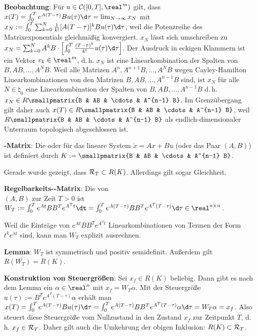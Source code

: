 \linie

\textbf{Beobachtung}:
Für $u \in \C([0, T], \real^m)$ gilt, dass
$x(T) = \int_0^T e^{A(T-\tau)} B u(\tau) \d\tau = \lim_{N \to \infty} x_N$
mit $x_N := \int_0^T \sum_{k=0}^N \frac{1}{k!} [A(T - \tau)]^k Bu(\tau)\d\tau$,
weil die Potenzreihe des Matrixexponentials gleichmäßig konvergiert.
$x_N$ lässt sich umschreiben zu
$x_N = \sum_{k=0}^N A^k B \cdot \left[\int_0^T \frac{(T - \tau)^k}{k!} u(\tau)\d\tau\right]$.
Der Ausdruck in eckigen Klammern ist ein Vektor $v_k \in \real^m$,
d.\,h. $x_N$ ist eine Linearkombination der Spalten von $B, AB, \dotsc, A^N B$.
Weil alle Matrizen $A^n, A^{n+1} B, \dotsc, A^N B$ wegen Cayley-Hamilton
Linearkombinationen von den Matrizen $B, AB, \dotsc, A^{n-1} B$ sind,
ist $x_N$ für alle $N \in \natural_0$ eine Linearkombination der Spalten
von $B, AB, \dotsc, A^{n-1} B$
d.\,h. $x_N \in R\smallpmatrix{B & AB & \cdots & A^{n-1} B}$.
Im Grenzübergang gilt daher auch $x(T) \in R\smallpmatrix{B & AB & \cdots & A^{n-1} B}$,
weil $R\smallpmatrix{B & AB & \cdots & A^{n-1} B}$ als endlich-dimensionaler Unterraum
topologisch abgeschlossen ist.

\textbf{-Matrix}:
Die  oder 
für das lineare System
$\dot{x} = Ax + Bu$ (oder das Paar $(A, B)$) ist definiert durch
$K := \smallpmatrix{B & AB & \cdots & A^{n-1} B}$.

Gerade wurde gezeigt, dass $\mathcal{R}_T \subset R(K)$.
Allerdings gilt sogar Gleichheit.

\linie
\pagebreak

\textbf{Regelbarkeits--Matrix}:
Die  von\\
$(A, B)$ zur Zeit $T > 0$ ist
$W_T := \int_0^T e^{At} BB^T e^{A^Tt}\dt =
\int_0^T e^{A(T-\tau)} BB^T e^{A^T(T-\tau)}\d\tau \in \real^{n \times n}$.

Weil die Einträge von $e^{At} BB^T e^{A^Tt}$ Linearkombinationen von Termen der Form
$t^k e^{\lambda t}$ sind, kann man $W_T$ explizit ausrechnen.

\textbf{Lemma}:
$W_T$ ist symmetrisch und positiv semidefinit.
Außerdem gilt $R(W_T) = R(K)$.

\textbf{Konstruktion von Steuergrößen}:
Sei $x_f \in R(K)$ beliebig.
Dann gibt es nach dem Lemma ein $\alpha \in \real^n$ mit $x_f = W_T \alpha$.
Mit der Steuergröße $u(\tau) := B^T e^{A^T (T - \tau)} \alpha$ erhält man\\
$x(T) = \int_0^T e^{A(T - \tau)} Bu(\tau) \d\tau
= \int_0^T e^{A(T - \tau)} B B^T e^{A^T (T - \tau)} \alpha \d\tau
= W_T \alpha = x_f$.
Also steuert diese Steuergröße vom Nullzustand in den Zustand $x_f$ zur Zeitpunkt $T$,
d.\,h. $x_f \in \mathcal{R}_T$.
Daher gilt auch die Umkehrung der obigen Inklusion: $R(K) \subset \mathcal{R}_T$.

